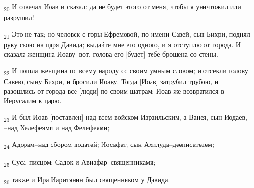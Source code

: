 \begin{tcolorbox}
\textsubscript{20} И отвечал Иоав и сказал: да не будет этого от меня, чтобы я уничтожил или разрушил!
\end{tcolorbox}
\begin{tcolorbox}
\textsubscript{21} Это не так; но человек с горы Ефремовой, по имени Савей, сын Бихри, поднял руку свою на царя Давида; выдайте мне его одного, и я отступлю от города. И сказала женщина Иоаву: вот, голова его [будет] тебе брошена со стены.
\end{tcolorbox}
\begin{tcolorbox}
\textsubscript{22} И пошла женщина по всему народу со своим умным словом; и отсекли голову Савею, сыну Бихри, и бросили Иоаву. Тогда [Иоав] затрубил трубою, и разошлись от города все [люди] по своим шатрам; Иоав же возвратился в Иерусалим к царю.
\end{tcolorbox}
\begin{tcolorbox}
\textsubscript{23} И был Иоав [поставлен] над всем войском Израильским, а Ванея, сын Иодаев, --над Хелефеями и над Фелефеями;
\end{tcolorbox}
\begin{tcolorbox}
\textsubscript{24} Адорам--над сбором податей; Иосафат, сын Ахилуда--дееписателем;
\end{tcolorbox}
\begin{tcolorbox}
\textsubscript{25} Суса--писцом; Садок и Авиафар--священниками;
\end{tcolorbox}
\begin{tcolorbox}
\textsubscript{26} также и Ира Иаритянин был священником у Давида.
\end{tcolorbox}
